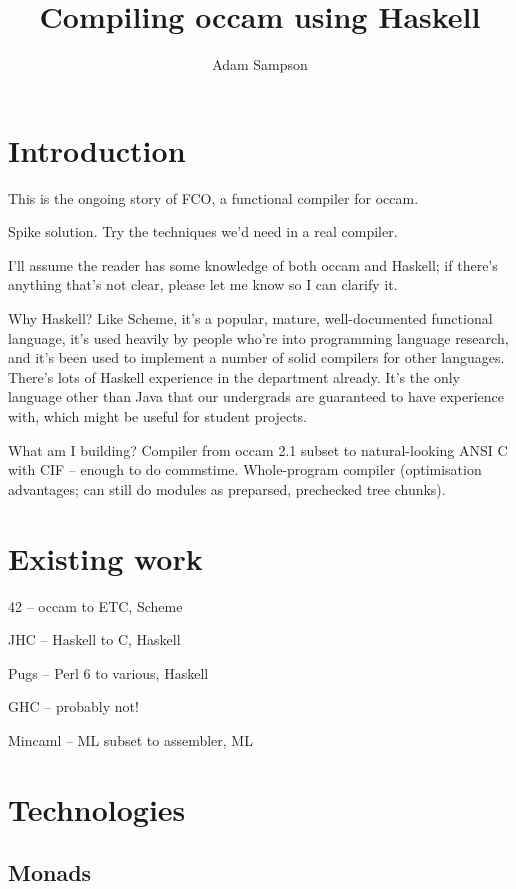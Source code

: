 \documentclass[a4paper,12pt]{article}
\def\occam{{\sffamily occam}\xspace}
\begin{document}
\title{Compiling \occam using Haskell}
\author{Adam Sampson}
\maketitle

\section{Introduction}

This is the ongoing story of FCO, a functional compiler for \occam.

Spike solution. Try the techniques we'd need in a real compiler.

I'll assume the reader has some knowledge of both \occam and Haskell; if
there's anything that's not clear, please let me know so I can clarify
it.

Why Haskell? Like Scheme, it's a popular, mature, well-documented
functional language, it's used heavily by people who're into programming
language research, and it's been used to implement a number of solid
compilers for other languages. There's lots of Haskell experience in the
department already. It's the only language other than Java that our
undergrads are guaranteed to have experience with, which might be useful
for student projects.

What am I building? Compiler from \occam 2.1 subset to natural-looking
ANSI C with CIF -- enough to do commstime. Whole-program compiler
(optimisation advantages; can still do modules as preparsed, prechecked
tree chunks).

\section{Existing work}

42 -- \occam to ETC, Scheme

JHC -- Haskell to C, Haskell

Pugs -- Perl 6 to various, Haskell

GHC -- probably not!

Mincaml -- ML subset to assembler, ML

\section{Technologies}

\subsection{Monads}
\end{document}
